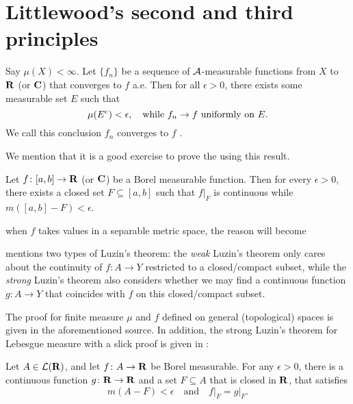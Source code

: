 \section{Littlewood's second and third principles} \label{sec:Littlewood-2nd-3rd}
\begin{namedthm} \label{thm:Egoroff}
    Say $\mu(X)<\infty$. Let $\{f_n\}$ be a sequence of $\mathcal{A}$-measurable functions from $X$ to $\mathbf{R}$ (or $\mathbf{C}$) that converges to $f$ a.e. Then for all $\epsilon > 0$, there exists some measurable set $E$ such that \[
        \mu(E^{\mathrm{c}}) < \epsilon, \quad \text{while } f_n \to f \text{ uniformly on } E.
    \]
    We call this conclusion $f_n$ converges to $f$ .
\end{namedthm}

We mention that it is a good exercise to prove the  using this result.
\begin{namedthm}
    Let $f\colon [a,b] \to \mathbf{R}$ (or $\mathbf{C}$) be a Borel measurable function. Then for every $\epsilon >0$, there exists a closed set $F \subseteq [a,b]$ such that $f|_F$ is continuous while $m([a,b] - F) < \epsilon$.
\end{namedthm}

when $f$ takes values in a separable metric space,  the reason will become 

\textcite[Box~1.6]{Santambrogio_2015} mentions two types of Luzin's theorem: the \emph{weak} Luzin's theorem only cares about the continuity of $f\colon A \to Y$ restricted to a closed/compact subset, while the \emph{strong} Luzin's theorem also considers whether we may find a continuous function $g\colon A \to Y$ that coincides with $f$ on this closed/compact subset.

The proof for finite measure $\mu$ and $f$ defined on general (topological) spaces is given in the aforementioned source. In addition, the strong Luzin's theorem for Lebesgue measure with a slick proof is given in \cite[Section~3.3]{Royden_2023}:  
\begin{thm}
    Let $A \in \mathcal L(\mathbf{R})$, and let $f\colon A \to \mathbf{R}$ be Borel measurable. For any $\epsilon > 0$, there is a continuous function $g \colon \mathbf{R} \to \mathbf{R}$ and a set $F \subseteq A$ that is closed in $\mathbf{R}$, that satisfies \[
        m(A - F) < \epsilon\quad \text{and}\quad f\vert_F = g\vert_F.
    \]
\end{thm}


